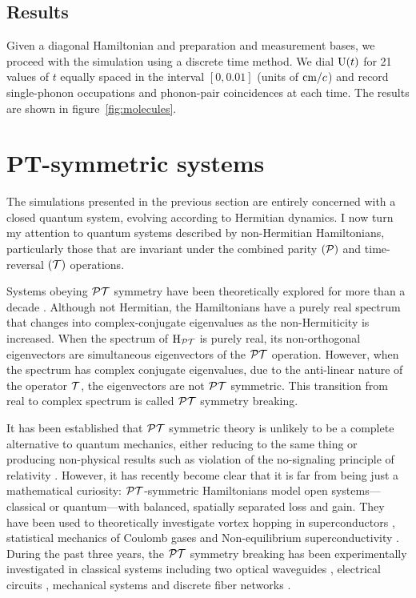 \subsection{Results}
Given a diagonal Hamiltonian and preparation and measurement bases, we proceed
with the simulation using a discrete time method. We dial \(\mathrm{U} \!\left(t\right)\) for
21 values of \(t\) equally spaced in the interval \(\left[0,0.01\right]\)
(units of \(\text{cm} / c\)) and record single-phonon occupations and
phonon-pair coincidences at each time. The results are shown in
figure~\ref{fig:molecules}.


\section{PT-symmetric systems}
\label{sec:PT}
The simulations presented in the previous section are entirely concerned with a
closed quantum system, evolving according to Hermitian dynamics. I now turn my
attention to quantum systems described by non-Hermitian Hamiltonians,
particularly those that are invariant under the combined parity \((\mathcal{P})\) and
time-reversal \((\mathcal{T})\) operations.

Systems obeying \(\mathcal{PT}\) symmetry have been theoretically explored for more than
a decade \cite{bender98, levai-jphysa-33-7165, bender07}. Although not
Hermitian, the Hamiltonians have a purely real spectrum that changes into
complex-conjugate eigenvalues as the non-Hermiticity is increased. When the
spectrum of \(\mathrm{H}_{\mathcal{PT}{}}\) is purely real, its non-orthogonal
eigenvectors are simultaneous eigenvectors of the \(\mathcal{PT}{}\) operation. However,
when the spectrum has complex conjugate eigenvalues, due to the anti-linear
nature of the operator \(\mathcal{T}\), the eigenvectors are not \(\mathcal{PT}{}\)
symmetric. This transition from real to complex spectrum is called \(\mathcal{PT}{}\)
symmetry breaking. 

It has been established that \(\mathcal{PT}{}\) symmetric theory is unlikely to be a
complete alternative to quantum mechanics, either reducing to the same thing
\cite{mostafazadeh-jmathphys-43-205} or producing non-physical results such as
violation of the no-signaling principle of relativity \cite{lee-prl-112-130404}.
However, it has recently become clear that it is far from being just a
mathematical curiosity: \(\mathcal{PT}{}\)-symmetric Hamiltonians model open
systems---classical or quantum---with balanced, spatially separated loss and
gain. They have been used to theoretically investigate vortex hopping in
superconductors \cite{naomichi-physrevlett-77-570},
statistical mechanics of Coulomb gases \cite{gulden-jetp-117-517} and
Non-equilibrium superconductivity \cite{rubinstein-physrevlett-99-167003,
serbyn-physrevb-87-020501}. During the past three years, the \(\mathcal{PT}{}\)
symmetry breaking has been experimentally investigated in classical systems
including two optical waveguides \cite{pt-ruter}, electrical circuits
\cite{schindler-physreva-84-040101}, mechanical systems
\cite{bender-amjphys-81-173} and discrete fiber networks
\cite{pt-regensburger}.


